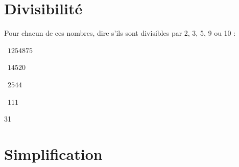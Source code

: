 
\section{Divisibilité}

Pour chacun de ces nombres, dire s'ils sont divisibles par 2, 3, 5, 9 ou 10 :
\begin{questions}
	
	
	
	
	
	\question[2]  $\num{1254875}$
	\fillwithdottedlines{1.5cm}
	\begin{solution}
		
	\end{solution}
	
	\question[2]  $\num{14520}$
	\fillwithdottedlines{1.5cm}
	\begin{solution}
		
	\end{solution}

	\question[2]  $\num{2544}$
	\fillwithdottedlines{1.5cm}
	\begin{solution}
	
	\end{solution}


	\question[2]  $\num{111}$
	\fillwithdottedlines{1.5cm}
	\begin{solution}
		31
	\end{solution}	 
	
\end{questions}

\newpage

\section{Simplification}


